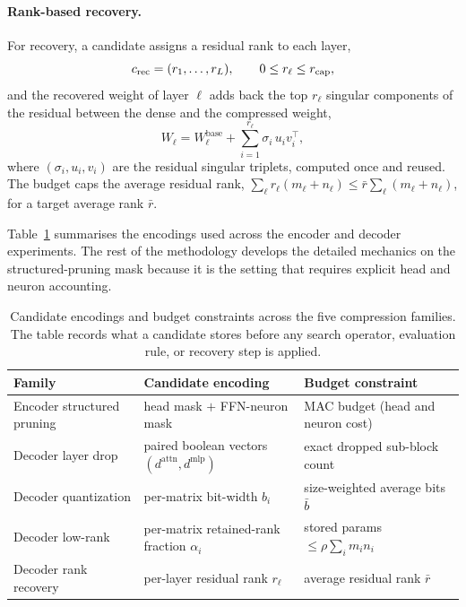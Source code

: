 \paragraph{Rank-based recovery.}
For recovery, a candidate assigns a residual rank to each layer,
\begin{equation}
c_{\mathrm{rec}}
=
(r_1, \dots, r_L),
\qquad
0 \le r_\ell \le r_{\mathrm{cap}},
\end{equation}
and the recovered weight of layer $\ell$ adds back the top $r_\ell$ singular components of the residual between the dense and the compressed weight,
\begin{equation}
W_\ell = W^{\mathrm{base}}_\ell + \sum_{i=1}^{r_\ell} \sigma_i\, u_i v_i^\top,
\end{equation}
where $(\sigma_i, u_i, v_i)$ are the residual singular triplets, computed once and reused. The budget caps the average residual rank, $\sum_\ell r_\ell (m_\ell + n_\ell) \le \bar{r} \sum_\ell (m_\ell + n_\ell)$, for a target average rank $\bar{r}$.

Table~\ref{tab:candidate_forms} summarises the encodings used across the encoder and decoder experiments. The rest of the methodology develops the detailed mechanics on the structured-pruning mask because it is the setting that requires explicit head and neuron accounting.

\begin{table}[h]
\centering
\footnotesize
\setlength{\tabcolsep}{4pt}
\begin{tabularx}{\textwidth}{llX}
\toprule
Family & Candidate encoding & Budget constraint \\
\midrule
Encoder structured pruning & head mask $+$ FFN-neuron mask & MAC budget (head and neuron cost) \\
Decoder layer drop & paired boolean vectors $(d^{\mathrm{attn}}, d^{\mathrm{mlp}})$ & exact dropped sub-block count \\
Decoder quantization & per-matrix bit-width $b_i$ & size-weighted average bits $\bar{b}$ \\
Decoder low-rank & per-matrix retained-rank fraction $\alpha_i$ & stored params $\le \rho \sum_i m_i n_i$ \\
Decoder rank recovery & per-layer residual rank $r_\ell$ & average residual rank $\bar{r}$ \\
\bottomrule
\end{tabularx}
\caption{Candidate encodings and budget constraints across the five compression families. The table records what a candidate stores before any search operator, evaluation rule, or recovery step is applied.}
\label{tab:candidate_forms}
\end{table}
